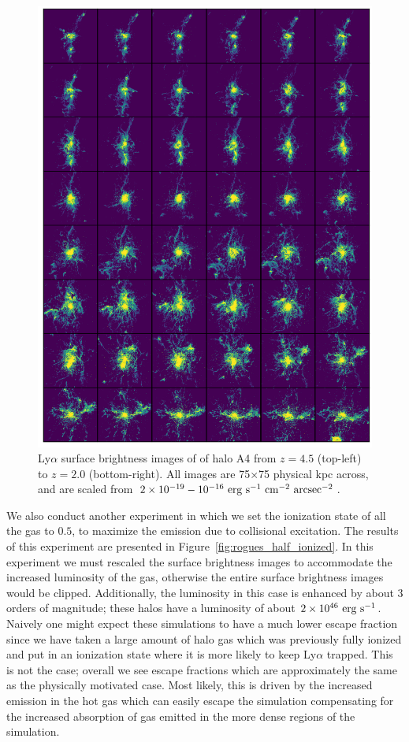 \begin{figure}
    \centering
    \includegraphics[width=\textwidth,keepaspectratio]{figures/rogues_fully_ionized.png}
    \caption{
        Ly$\alpha$ surface brightness images of of halo A4 from $z=4.5$ (top-left) to $z=2.0$ (bottom-right).
        All images are 75$\times$75 physical kpc across, and are scaled from $2\times10^{-19}-10^{-16}\ \rm{erg}\ \rm{s}^{-1}\ \rm{cm}^{-2}\ \rm{arcsec}^{-2}$.
    }
  \label{fig:rogues_fully_ionized}
\end{figure}


We also conduct another experiment in which we set the ionization state of all the gas to $0.5$, to maximize the emission due to collisional excitation.
The results of this experiment are presented in Figure~\ref{fig:rogues_half_ionized}.
In this experiment we must rescaled the surface brightness images to accommodate the increased luminosity of the gas, otherwise the entire surface brightness images would be clipped.
Additionally, the luminosity in this case is enhanced by about 3 orders of magnitude; these halos have a luminosity of about $2\times10^{46}\ \rm{erg}\ \rm{s}^{-1}$.
Naively one might expect these simulations to have a much lower escape fraction since we have taken a large amount of halo gas which was previously fully ionized and put in an ionization state where it is more likely to keep Ly$\alpha$ trapped.
This is not the case; overall we see escape fractions which are approximately the same as the physically motivated case.
Most likely, this is driven by the increased emission in the hot gas which can easily escape the simulation compensating for the increased absorption of gas emitted in the more dense regions of the simulation.


